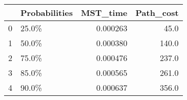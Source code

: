 \begin{tabular}{llrr}
\toprule
{} & Probabilities &  MST\_time &  Path\_cost \\
\midrule
0 &         25.0\% &  0.000263 &       45.0 \\
1 &         50.0\% &  0.000380 &      140.0 \\
2 &         75.0\% &  0.000476 &      237.0 \\
3 &         85.0\% &  0.000565 &      261.0 \\
4 &         90.0\% &  0.000637 &      356.0 \\
\bottomrule
\end{tabular}
